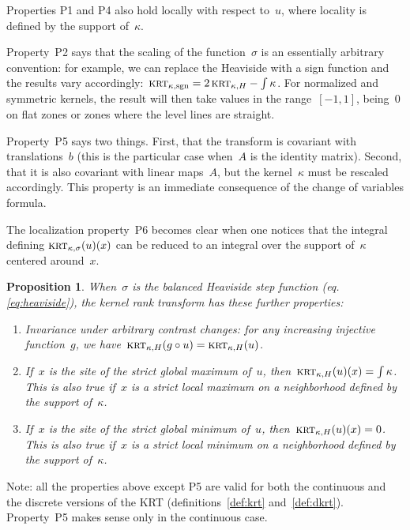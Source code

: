 \documentclass[12pt]{article}                  %
\newtheorem{proposition}{Proposition}
\begin{document}
Properties P1 and P4 also hold locally with respect to~$u$, where locality is
defined by the support of~$\kappa$.

Property~P2 says that the scaling of the function~$\sigma$ is an essentially
arbitrary convention: for example, we can replace the Heaviside with a sign
function and the results vary
accordingly:~$\textsc{krt}_{\kappa,\mathrm{sgn}}=2\,\textsc{krt}_{\kappa,H}-\int\kappa$.
For normalized and symmetric kernels, the result will then take values in
the range~$[-1,1]$, being~$0$ on flat zones or zones where the level lines
are straight.

Property~P5 says two things.  First, that the transform is covariant with
translations~$b$ (this is the particular case when~$A$ is the identity
matrix).  Second, that it is also covariant with linear maps~$A$, but the
kernel~$\kappa$ must be rescaled accordingly.  This property is an immediate
consequence of the change of variables formula.

The localization property~P6 becomes clear when one notices that the
integral defining $\textsc{krt}_{\kappa,\sigma}(u)(x)$ can be reduced to an
integral over the support of~$\kappa$ centered around~$x$.

\begin{proposition}
	When~$\sigma$ is the balanced Heaviside step function (eq.\ref{eq:heaviside}),
	the kernel rank
	transform has these further properties:
	\begin{enumerate}
		\item[\bf H1] Invariance under arbitrary contrast changes: for
			any increasing injective function~$g$, we
			have~$\textsc{krt}_{\kappa,H}(g\circ
			u)=\textsc{krt}_{\kappa,H}(u)$.
		\item[\bf H2] If~$x$ is the site of the strict global
			maximum of~$u$,
			then~$\textsc{krt}_{\kappa,H}(u)(x)=\int\kappa$.  This is also
			true if~$x$ is a strict local maximum on a
			neighborhood defined by the support of~$\kappa$.
		\item[\bf H3] If~$x$ is the site of the strict global
			minimum of~$u$, then~$\textsc{krt}_{\kappa,H}(u)(x)=0$.  This
			is also true if~$x$ is a strict local minimum on a
			neighborhood defined by the support of~$\kappa$.
	\end{enumerate}
\end{proposition}

Note: all the properties above except P5 are valid for both the continuous
and the discrete versions of the KRT (definitions~\ref{def:krt}
and~\ref{def:dkrt}).  Property~P5 makes sense only in the continuous case.
\end{document}
